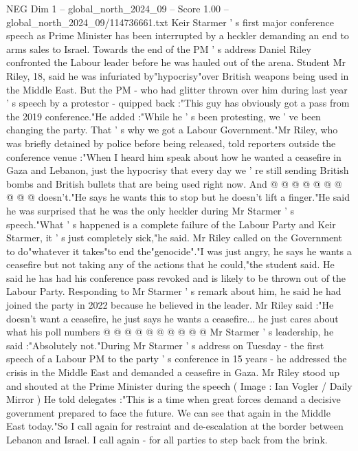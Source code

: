 \begin{textsample}{NEG Dim 1 – global\_north\_2024\_09 – Score 1.00 – global\_north\_2024\_09/114736661.txt}  \label{ex:f1_neg_026}
Keir Starmer ' s first major conference speech as Prime Minister has been interrupted by a heckler demanding an end to arms sales to Israel.
Towards the end of the PM ' s address Daniel Riley confronted the Labour leader before he was hauled out of the arena.
Student Mr Riley, 18, said he was infuriated by"hypocrisy"over British weapons being used in the Middle East.
But the PM - who had glitter thrown over him during last year ' s speech by a protestor - quipped back :"This guy has obviously got a pass from the 2019 conference."He added :"While he ' s been protesting, we ' ve been changing the party.
That ' s why we got a Labour Government."Mr Riley, who was briefly detained by police before being released, told reporters outside the conference venue :"When I heard him speak about how he wanted a ceasefire in Gaza and Lebanon, just the hypocrisy that every day we ' re still sending British bombs and British bullets that are being used right now.
And @ @ @ @ @ @ @ @ @ @ doesn't."He says he wants this to stop but he doesn't lift a finger."He said he was surprised that he was the only heckler during Mr Starmer ' s speech."What ' s happened is a complete failure of the Labour Party and Keir Starmer, it ' s just completely sick,"he said.
Mr Riley called on the Government to do"whatever it takes"to end the"genocide"."I was just angry, he says he wants a ceasefire but not taking any of the actions that he could,"the student said.
He said he has had his conference pass revoked and is likely to be thrown out of the Labour Party.
Responding to Mr Starmer ' s remark about him, he said he had joined the party in 2022 because he believed in the leader.
Mr Riley said :"He doesn't want a ceasefire, he just says he wants a ceasefire... he just cares about what his poll numbers @ @ @ @ @ @ @ @ @ @ Mr Starmer ' s leadership, he said :"Absolutely not."During Mr Starmer ' s address on Tuesday - the first speech of a Labour PM to the party ' s conference in 15 years - he addressed the crisis in the Middle East and demanded a ceasefire in Gaza.
Mr Riley stood up and shouted at the Prime Minister during the speech ( Image : Ian Vogler / Daily Mirror ) He told delegates :"This is a time when great forces demand a decisive government prepared to face the future.
We can see that again in the Middle East today."So I call again for restraint and de-escalation at the border between Lebanon and Israel.
I call again - for all parties to step back from the brink.

\end{textsample}

